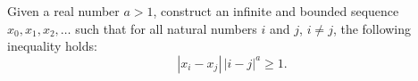 Given a real number $a > 1$, construct an infinite and bounded sequence $x_0, x_1, x_2, \ldots$ such that for all natural numbers $i$ and $j$, $i \neq j$, the following inequality holds:
\[ |x_i - x_j| \, |i - j|^a \geq 1. \]
